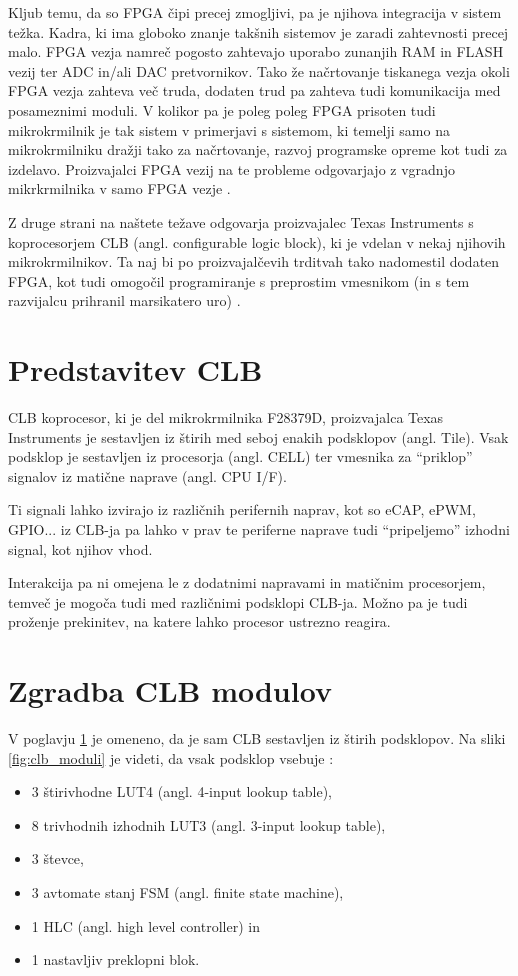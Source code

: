 \documentclass[a4paper]{article}
\begin{document}
\begin{sloppypar}
Kljub temu, da so FPGA čipi precej zmogljivi, pa je njihova integracija v
sistem težka.  Kadra, ki ima globoko znanje takšnih sistemov je zaradi
zahtevnosti precej malo. FPGA vezja namreč pogosto zahtevajo uporabo zunanjih
RAM in FLASH vezij ter ADC in/ali DAC pretvornikov. Tako že načrtovanje
tiskanega vezja okoli FPGA vezja zahteva več truda, dodaten trud pa zahteva
tudi komunikacija med posameznimi moduli. V kolikor pa je poleg poleg FPGA
prisoten tudi mikrokrmilnik je tak sistem v primerjavi s sistemom, ki temelji
samo na mikrokrmilniku dražji tako za načrtovanje, razvoj programske
opreme kot tudi za izdelavo. Proizvajalci FPGA vezij na te probleme odgovarjajo
z vgradnjo mikrkrmilnika v samo FPGA vezje \cite{fpga-developers-guide}.

Z druge strani na naštete težave odgovarja proizvajalec Texas Instruments s
koprocesorjem CLB (angl. configurable logic block), ki je vdelan v nekaj
njihovih mikrokrmilnikov. Ta naj bi po proizvajalčevih trditvah tako nadomestil
dodaten FPGA, kot tudi omogočil programiranje s preprostim vmesnikom (in s tem
razvijalcu prihranil marsikatero uro) \cite{clb-intro}.


\section{Predstavitev CLB}\label{sec:predstavitev}
CLB koprocesor, ki je del mikrokrmilnika F28379D, proizvajalca Texas
Instruments je sestavljen iz štirih med seboj enakih podsklopov (angl. Tile).
Vsak podsklop je sestavljen iz procesorja (angl. CELL) ter vmesnika za
``priklop'' signalov iz matične naprave (angl. CPU I/F).

Ti signali lahko izvirajo iz različnih perifernih naprav, kot so eCAP, ePWM,
GPIO... iz CLB-ja pa lahko v prav te periferne naprave tudi ``pripeljemo''
izhodni signal, kot njihov vhod.

Interakcija pa ni omejena le z dodatnimi napravami in matičnim procesorjem,
temveč je mogoča tudi med različnimi podsklopi CLB-ja. Možno pa je tudi
proženje prekinitev, na katere lahko procesor ustrezno reagira.

\section{Zgradba CLB modulov}\label{sec:zgradbaclb}
V poglavju \ref{sec:predstavitev} je omeneno, da je sam CLB sestavljen iz
štirih podsklopov. Na sliki \ref{fig:clb_moduli} je videti, da vsak podsklop
vsebuje \cite[Pogl.~26.4]{mcu-ref-manual}:
\begin{itemize}
    \item 3 štirivhodne LUT4 (angl. 4-input lookup table),
    \item 8 trivhodnih izhodnih LUT3 (angl. 3-input lookup table),
    \item 3 števce,
    \item 3 avtomate stanj FSM (angl. finite state machine),
    \item 1 HLC (angl. high level controller) in
    \item 1 nastavljiv preklopni blok.
\end{itemize}


\end{sloppypar}
\end{document}
